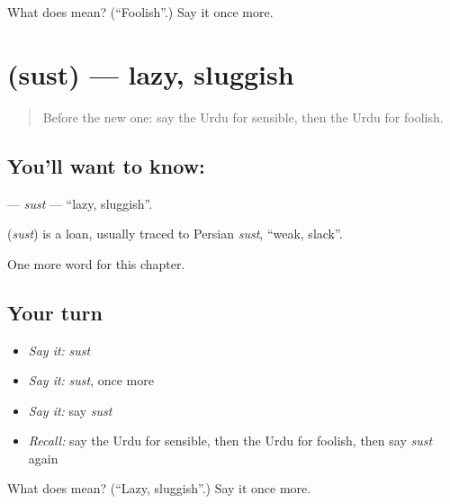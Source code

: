 \begin{tcolorbox}[breakable,colback=teal!4,colframe=teal!35!black,title={Before you move on}]
What does  mean? (\textquotedblleft{}Foolish\textquotedblright{}.) Say it once more.
\end{tcolorbox}
\section[\texorpdfstring{\ur{سست} (sust)}{سست (sust)}]{ (sust) — lazy, sluggish}

\label{lesson:UR-C160-sust}



\begin{quote}
Before the new one: say the Urdu for sensible, then the Urdu for foolish.
\end{quote}

\subsection*{You'll want to know: }
\textbf{} — \emph{sust} — \textquotedblleft{}lazy, sluggish\textquotedblright{}.

\begin{cousinweb}
\textbf{} (\emph{sust}) is a loan, usually traced to Persian \emph{sust}, \textquotedblleft{}weak, slack\textquotedblright{}.
\end{cousinweb}

\begin{grammarlens}[title={What you've built}]
One more word for this chapter.
\end{grammarlens}

\subsection*{Your turn}
\begin{itemize}
\raggedright
  \item \emph{Say it:} \emph{sust}
  \item \emph{Say it:} \emph{sust}, once more
  \item \emph{Say it:} say \emph{sust}
  \item \emph{Recall:} say the Urdu for sensible, then the Urdu for foolish, then say \emph{sust} again
\end{itemize}

\begin{tcolorbox}[breakable,colback=teal!4,colframe=teal!35!black,title={Before you move on}]
What does  mean? (\textquotedblleft{}Lazy, sluggish\textquotedblright{}.) Say it once more.
\end{tcolorbox}
